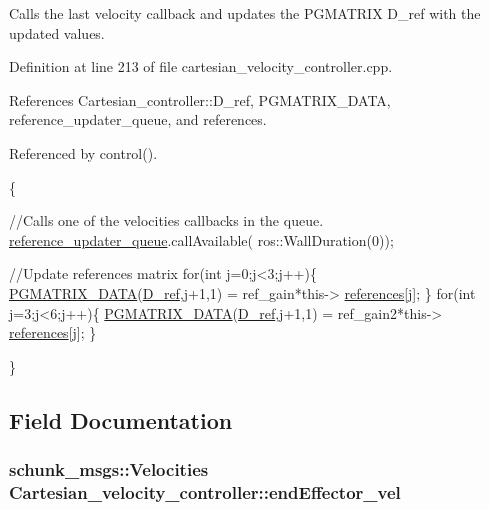 Calls the last velocity callback and updates the P\-G\-M\-A\-T\-R\-I\-X D\-\_\-ref with the updated values. 



Definition at line 213 of file cartesian\-\_\-velocity\-\_\-controller.\-cpp.



References Cartesian\-\_\-controller\-::\-D\-\_\-ref, P\-G\-M\-A\-T\-R\-I\-X\-\_\-\-D\-A\-T\-A, reference\-\_\-updater\-\_\-queue, and references.



Referenced by control().


\begin{DoxyCode}
                                                                               
                   \{

        \textcolor{comment}{//Calls one of the velocities callbacks in the queue.}
        \hyperlink{classCartesian__velocity__controller_ad2804cf83a42305d18572abdbbfd1c3f}{reference\_updater\_queue}.callAvailable(
      ros::WallDuration(0));

        \textcolor{comment}{//Update references matrix}
        \textcolor{keywordflow}{for}(\textcolor{keywordtype}{int} j=0;j<3;j++)\{
                \hyperlink{gmatrix_8h_a7333180c47234295df2bd7b09ac00da8}{PGMATRIX\_DATA}(\hyperlink{classCartesian__controller_abb248cb3215a574fe8e1bb8fb0b8626d}{D\_ref},j+1,1) = ref\_gain*this->
      \hyperlink{classCartesian__velocity__controller_afc3792f1f6dd0025417d752a89e519e1}{references}[j];
        \}
        \textcolor{keywordflow}{for}(\textcolor{keywordtype}{int} j=3;j<6;j++)\{
                \hyperlink{gmatrix_8h_a7333180c47234295df2bd7b09ac00da8}{PGMATRIX\_DATA}(\hyperlink{classCartesian__controller_abb248cb3215a574fe8e1bb8fb0b8626d}{D\_ref},j+1,1) = ref\_gain2*this->
      \hyperlink{classCartesian__velocity__controller_afc3792f1f6dd0025417d752a89e519e1}{references}[j];
        \}

\}
\end{DoxyCode}


\subsection{Field Documentation}
\hypertarget{classCartesian__velocity__controller_ae771d963a90ad7b844c4c3a821ce5f39}{
\subsubsection[{end\-Effector\-\_\-vel}]{\setlength{\rightskip}{0pt plus 5cm}schunk\-\_\-msgs\-::\-Velocities Cartesian\-\_\-velocity\-\_\-controller\-::end\-Effector\-\_\-vel\hspace{0.3cm}{\ttfamily [protected]}}}\label{classCartesian__velocity__controller_ae771d963a90ad7b844c4c3a821ce5f39}


